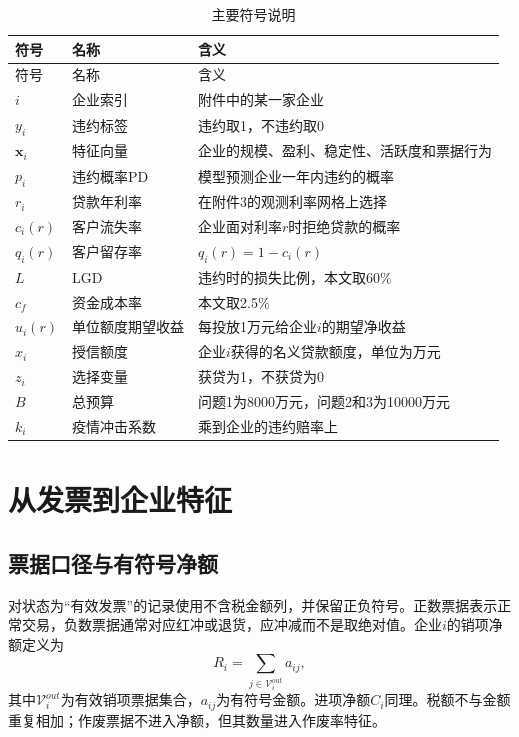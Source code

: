 \documentclass[12pt,a4paper]{ctexart}
\begin{document}
\begin{longtable}{p{1.7cm}p{4.3cm}p{7.5cm}}
\caption{主要符号说明}\\
\toprule
符号 & 名称 & 含义\\
\midrule
\endfirsthead
\toprule
符号 & 名称 & 含义\\
\midrule
\endhead
$i$ & 企业索引 & 附件中的某一家企业\\
$y_i$ & 违约标签 & 违约取1，不违约取0\\
$\boldsymbol x_i$ & 特征向量 & 企业的规模、盈利、稳定性、活跃度和票据行为\\
$p_i$ & 违约概率PD & 模型预测企业一年内违约的概率\\
$r_i$ & 贷款年利率 & 在附件3的观测利率网格上选择\\
$c_i(r)$ & 客户流失率 & 企业面对利率$r$时拒绝贷款的概率\\
$q_i(r)$ & 客户留存率 & $q_i(r)=1-c_i(r)$\\
$L$ & LGD & 违约时的损失比例，本文取60\%\\
$c_f$ & 资金成本率 & 本文取2.5\%\\
$u_i(r)$ & 单位额度期望收益 & 每投放1万元给企业$i$的期望净收益\\
$x_i$ & 授信额度 & 企业$i$获得的名义贷款额度，单位为万元\\
$z_i$ & 选择变量 & 获贷为1，不获贷为0\\
$B$ & 总预算 & 问题1为8000万元，问题2和3为10000万元\\
$k_i$ & 疫情冲击系数 & 乘到企业的违约赔率上\\
\bottomrule
\end{longtable}

\section{从发票到企业特征}

\subsection{票据口径与有符号净额}

对状态为“有效发票”的记录使用不含税金额列，并保留正负符号。正数票据表示正常交易，负数票据通常对应红冲或退货，应冲减而不是取绝对值。企业$i$的销项净额定义为
\begin{equation}
R_i=\sum_{j\in\mathcal V_i^{out}}a_{ij},
\end{equation}
其中$\mathcal V_i^{out}$为有效销项票据集合，$a_{ij}$为有符号金额。进项净额$C_i$同理。税额不与金额重复相加；作废票据不进入净额，但其数量进入作废率特征。
\end{document}
